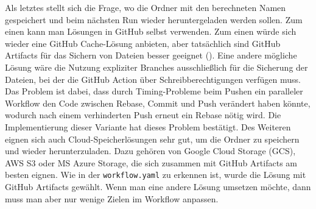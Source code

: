 Als letztes stellt sich die Frage, wo die Ordner mit den berechneten Namen gespeichert und beim nächsten Run wieder heruntergeladen werden sollen.
Zum einen kann man Lösungen in GitHub selbst verwenden.
Zum einen würde sich wieder eine GitHub Cache-Lösung anbieten, aber tatsächlich sind GitHub Artifacts für das Sichern von Dateien besser geeignet (\cite{github_cache_doku}).
Eine andere mögliche Lösung wäre die Nutzung expliziter Branches ausschließlich für die Sicherung der Dateien, bei der die GitHub Action über Schreibberechtigungen verfügen muss.
Das Problem ist dabei, dass durch Timing-Probleme beim Pushen ein paralleler Workflow den Code zwischen Rebase, Commit und Push verändert haben könnte, wodurch nach einem verhinderten Push erneut ein Rebase nötig wird.
Die Implementierung dieser Variante hat dieses Problem bestätigt.
Des Weiteren eignen sich auch Cloud-Speicherlösungen sehr gut, um die Ordner zu speichern und wieder herunterzuladen.
Dazu gehören von Google Cloud Storage (GCS), AWS S3 oder MS Azure Storage, die sich zusammen mit GitHub Artifacts am besten eignen.
Wie in der \texttt{workflow.yaml} zu erkennen ist, wurde die Lösung mit GitHub Artifacts gewählt.
Wenn man eine andere Lösung umsetzen möchte, dann muss man aber nur wenige Zielen im Workflow anpassen.